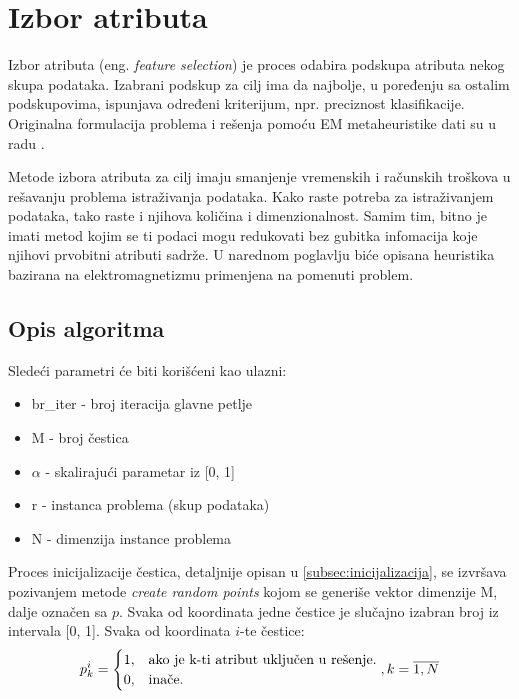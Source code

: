 \documentclass[a4paper]{article}
\begin{document}
\section{Izbor atributa}
\label{sec:izbor_atributa}
Izbor atributa (eng. \textit{feature selection}) je proces odabira podskupa atributa nekog skupa podataka. Izabrani podskup za cilj ima da najbolje, u poređenju sa ostalim podskupovima, ispunjava određeni kriterijum, npr. preciznost klasifikacije. Originalna formulacija problema i rešenja pomoću EM metaheuristike dati su u radu \cite{kartelj}.

Metode izbora atributa za cilj imaju smanjenje vremenskih i računskih troškova u rešavanju problema istraživanja podataka. Kako raste potreba za istraživanjem podataka, tako raste i njihova količina i dimenzionalnost. Samim tim, bitno je imati metod kojim se ti podaci mogu redukovati bez gubitka infomacija koje njihovi prvobitni atributi sadrže. U narednom poglavlju biće opisana heuristika bazirana na elektromagnetizmu primenjena na pomenuti problem.

\subsection{Opis algoritma}
\label{subsec:formulacija}
Sledeći parametri će biti korišćeni kao ulazni:
\begin{itemize}
    \item br\_iter - broj iteracija glavne petlje
    \item M - broj čestica
    \item $\alpha$ - skalirajući parametar iz [0, 1]
    \item r - instanca problema (skup podataka)
    \item N - dimenzija instance problema
\end{itemize}

Proces inicijalizacije čestica, detaljnije opisan u \ref{subsec:inicijalizacija}, se izvršava pozivanjem metode \textit{create random points} kojom se generiše vektor dimenzije M, dalje označen sa $p$. Svaka od koordinata jedne čestice je slučajno izabran broj iz intervala [0, 1].
Svaka od koordinata $i$-te čestice:
\begin{equation}
p_k^i=\begin{cases}
    $1$, & \text{ako je k-ti atribut uključen u rešenje}.\\
    $0$, & \text{inače}.
    \end{cases}, k=\overline{1, N}
\end{equation}
\end{document}
